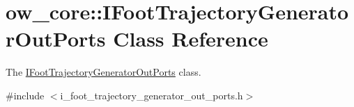 \hypertarget{classow__core_1_1IFootTrajectoryGeneratorOutPorts}{}\section{ow\+\_\+core\+:\+:I\+Foot\+Trajectory\+Generator\+Out\+Ports Class Reference}
\label{classow__core_1_1IFootTrajectoryGeneratorOutPorts}


The \hyperlink{classow__core_1_1IFootTrajectoryGeneratorOutPorts}{I\+Foot\+Trajectory\+Generator\+Out\+Ports} class.  




{\ttfamily \#include $<$i\+\_\+foot\+\_\+trajectory\+\_\+generator\+\_\+out\+\_\+ports.\+h$>$}

